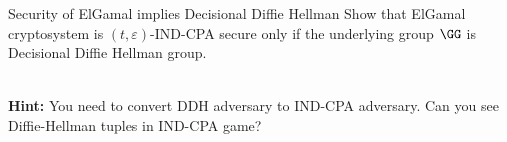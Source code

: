 \documentclass{crypto-exercise}
\author{Sven Laur}
\begin{document}
\begin{exercise}{Security of ElGamal implies Decisional Diffie Hellman}
Show that ElGamal cryptosystem is $(t,\varepsilon)$-IND-CPA secure only if the underlying group $\GG$ is Decisional Diffie Hellman group.
\end{exercise}


\begin{solution}\ \\
\textbf{Hint:} You need to convert DDH adversary to IND-CPA adversary. Can you see Diffie-Hellman tuples in IND-CPA game? 

\end{solution}
\end{document}

